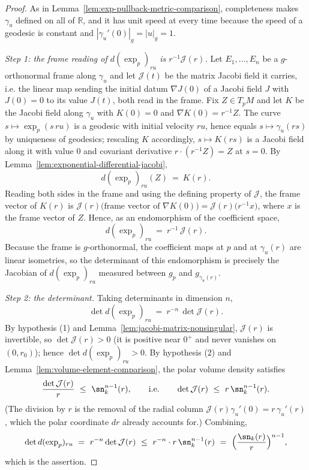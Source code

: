 \begin{proof}
\leanok
As in Lemma~\ref{lem:exp-pullback-metric-comparison}, completeness makes
$\gamma_u$ defined on all of $\mathbb R$, and it has unit speed at every time
because the speed of a geodesic is constant and $|\gamma_u'(0)|_g=|u|_g=1$.

\emph{Step 1: the frame reading of $d(\exp_p)_{ru}$ is $r^{-1}\mathcal J(r)$.}
Let $E_1,\dots,E_n$ be a $g$-orthonormal frame along $\gamma_u$ and let
$\mathcal J(t)$ be the matrix Jacobi field it carries, i.e. the linear map
sending the initial datum $\nabla J(0)$ of a Jacobi field $J$ with $J(0)=0$ to
its value $J(t)$, both read in the frame. Fix $Z\in T_pM$ and let $K$ be the
Jacobi field along $\gamma_u$ with $K(0)=0$ and $\nabla K(0)=r^{-1}Z$. The curve
$s\mapsto\exp_p(s\,ru)$ is a geodesic with initial velocity $ru$, hence equals
$s\mapsto\gamma_u(rs)$ by uniqueness of geodesics; rescaling $K$ accordingly,
$s\mapsto K(rs)$ is a Jacobi field along it with value $0$ and covariant
derivative $r\cdot(r^{-1}Z)=Z$ at $s=0$. By
Lemma~\ref{lem:exponential-differential-jacobi},
$$d(\exp_p)_{ru}(Z)\ =\ K(r).$$
Reading both sides in the frame and using the defining property of
$\mathcal J$, the frame vector of $K(r)$ is
$\mathcal J(r)\bigl(\text{frame vector of }\nabla K(0)\bigr)
=\mathcal J(r)\bigl(r^{-1}x\bigr)$, where $x$ is the frame vector of $Z$. Hence,
as an endomorphism of the coefficient space,
$$d(\exp_p)_{ru}\ =\ r^{-1}\,\mathcal J(r).$$
Because the frame is $g$-orthonormal, the coefficient maps at $p$ and at
$\gamma_u(r)$ are linear isometries, so the determinant of this endomorphism is
precisely the Jacobian of $d(\exp_p)_{ru}$ measured between $g_p$ and
$g_{\gamma_u(r)}$.

\emph{Step 2: the determinant.} Taking determinants in dimension $n$,
$$\det d(\exp_p)_{ru}\ =\ r^{-n}\,\det\mathcal J(r).$$
By hypothesis (1) and Lemma~\ref{lem:jacobi-matrix-nonsingular}, $\mathcal J(r)$
is invertible, so $\det\mathcal J(r)>0$ (it is positive near $0^+$ and never
vanishes on $(0,r_0)$); hence $\det d(\exp_p)_{ru}>0$. By hypothesis (2) and
Lemma~\ref{lem:volume-element-comparison}, the polar volume density satisfies
$$\frac{\det\mathcal J(r)}{r}\ \le\ \sn_k^{n-1}(r),
\qquad\text{i.e.}\qquad \det\mathcal J(r)\ \le\ r\,\sn_k^{n-1}(r).$$
(The division by $r$ is the removal of the radial column
$\mathcal J(r)\gamma_u'(0)=r\,\gamma_u'(r)$, which the polar coordinate $dr$
already accounts for.) Combining,
$$\det d(\exp_p)_{ru}\ =\ r^{-n}\det\mathcal J(r)
\ \le\ r^{-n}\cdot r\,\sn_k^{n-1}(r)
\ =\ \Bigl(\frac{\sn_k(r)}{r}\Bigr)^{n-1},$$
which is the assertion.


\end{proof}
